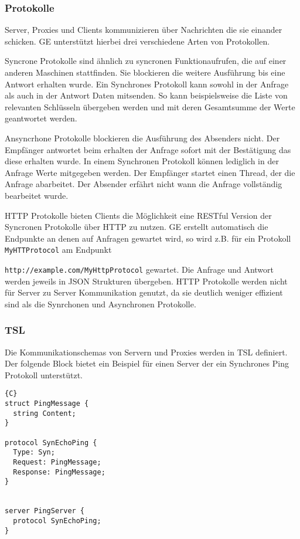 \subsubsection{Protokolle}

Server, Proxies und Clients kommunizieren über Nachrichten die sie einander schicken. GE unterstützt hierbei drei verschiedene Arten von Protokollen.


Syncrone Protokolle sind ähnlich zu syncronen Funktionaufrufen, die auf einer anderen Maschinen stattfinden. Sie blockieren die weitere Ausführung bis
eine Antwort erhalten wurde. Ein Synchrones Protokoll kann sowohl in der Anfrage als auch in der Antwort Daten mitsenden. So kann beispielsweise die Liste von
relevanten Schlüsseln übergeben werden und mit deren Gesamtsumme der Werte geantwortet werden.


Ansyncrhone Protokolle blockieren die Ausführung des Absenders nicht. Der Empfänger antwortet beim erhalten der Anfrage sofort mit der Bestätigung das diese erhalten wurde.
In einem Synchronen Protokoll können lediglich in der Anfrage Werte mitgegeben werden.
Der Empfänger startet einen Thread, der die Anfrage abarbeitet. Der Absender erfährt nicht wann die Anfrage vollständig bearbeitet wurde.


HTTP Protokolle bieten Clients die Möglichkeit eine RESTful Version der Syncronen Protokolle über HTTP zu nutzen. GE erstellt automatisch die Endpunkte an denen
auf Anfragen gewartet wird, so wird z.B. für ein Protokoll \verb|MyHTTProtocol| am Endpunkt

\verb|http://example.com/MyHttpProtocol| gewartet. Die Anfrage und
Antwort werden jeweils in JSON Strukturen übergeben. HTTP Protokolle werden nicht für Server zu Server Kommunikation genutzt, da sie deutlich weniger effizient sind als die
Synrchonen und Asynchronen Protokolle.

\subsubsection{TSL}

Die Kommunikationschemas von Servern und Proxies werden in TSL definiert. Der folgende Block bietet ein Beispiel für einen Server der ein Synchrones Ping Protokoll unterstützt.

\begin{lstlisting}{C}
struct PingMessage {
  string Content;
}

protocol SynEchoPing {
  Type: Syn;
  Request: PingMessage;
  Response: PingMessage;
}


server PingServer {
  protocol SynEchoPing;
}
\end{lstlisting}

